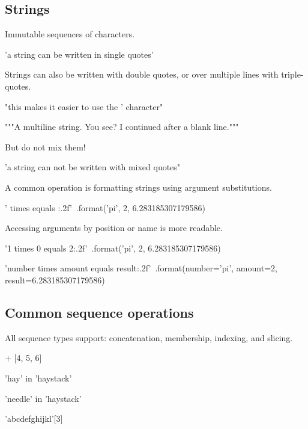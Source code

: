 \documentclass[aspectratio=1610,slidestop]{beamer}
\begin{document}
\subsection{Strings}
\begin{pframe}
Immutable sequences of characters.
\begin{pyconsole}
'a string can be written in single quotes'
\end{pyconsole}
\medskip
\medskip
Strings can also be written with double quotes, or over multiple lines with
triple-quotes.
\begin{pyconsole}
"this makes it easier to use the ' character"
\end{pyconsole}
\medskip
\begin{pyconsole}
"""A multiline string.
You see? I continued after a blank line."""
\end{pyconsole}
\end{pframe}

\begin{pframe}
But do not mix them!
\begin{pyconsole}
'a string can not be written with mixed quotes"
\end{pyconsole}
\end{pframe}

\begin{pframe}
\vspace{-0.3cm}
A common operation is formatting strings using argument substitutions.
\begin{pyconsole}
'{} times {} equals {:.2f}'\
    .format('pi', 2, 6.283185307179586)
\end{pyconsole}
\medskip
\medskip
Accessing arguments by position or name is more readable.
\begin{pyconsole}
'{1} times {0} equals {2:.2f}'\
    .format('pi', 2, 6.283185307179586)

'{number} times {amount} equals {result:.2f}'\
    .format(number='pi', amount=2, result=6.283185307179586)
\end{pyconsole}
\end{pframe}


\subsection{Common sequence operations}
\begin{pframe}
All sequence types support: concatenation, membership, indexing, and slicing.
\begin{pyconsole}
[1, 2, 3] + [4, 5, 6]

'hay' in 'haystack'

'needle' in 'haystack'

'abcdefghijkl'[3]
\end{pyconsole}
\end{pframe}
\end{document}
